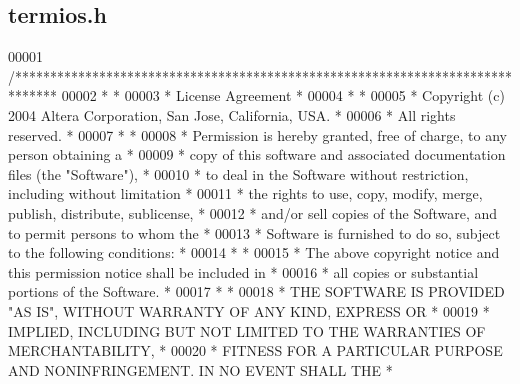 \subsection{termios.\+h}
\label{termios_8h_source}

\begin{DoxyCode}
00001 \textcolor{comment}{/******************************************************************************}
00002 \textcolor{comment}{*                                                                             *}
00003 \textcolor{comment}{* License Agreement                                                           *}
00004 \textcolor{comment}{*                                                                             *}
00005 \textcolor{comment}{* Copyright (c) 2004 Altera Corporation, San Jose, California, USA.           *}
00006 \textcolor{comment}{* All rights reserved.                                                        *}
00007 \textcolor{comment}{*                                                                             *}
00008 \textcolor{comment}{* Permission is hereby granted, free of charge, to any person obtaining a     *}
00009 \textcolor{comment}{* copy of this software and associated documentation files (the "Software"),  *}
00010 \textcolor{comment}{* to deal in the Software without restriction, including without limitation   *}
00011 \textcolor{comment}{* the rights to use, copy, modify, merge, publish, distribute, sublicense,    *}
00012 \textcolor{comment}{* and/or sell copies of the Software, and to permit persons to whom the       *}
00013 \textcolor{comment}{* Software is furnished to do so, subject to the following conditions:        *}
00014 \textcolor{comment}{*                                                                             *}
00015 \textcolor{comment}{* The above copyright notice and this permission notice shall be included in  *}
00016 \textcolor{comment}{* all copies or substantial portions of the Software.                         *}
00017 \textcolor{comment}{*                                                                             *}
00018 \textcolor{comment}{* THE SOFTWARE IS PROVIDED "AS IS", WITHOUT WARRANTY OF ANY KIND, EXPRESS OR  *}
00019 \textcolor{comment}{* IMPLIED, INCLUDING BUT NOT LIMITED TO THE WARRANTIES OF MERCHANTABILITY,    *}
00020 \textcolor{comment}{* FITNESS FOR A PARTICULAR PURPOSE AND NONINFRINGEMENT. IN NO EVENT SHALL THE *}

\end{DoxyCode}
